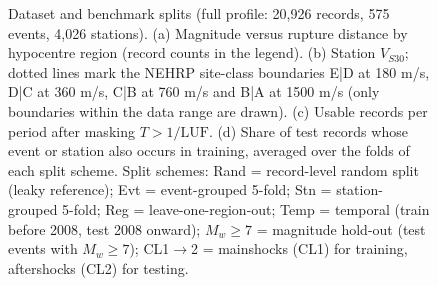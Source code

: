 \begin{figure}[htbp]
\centering
{}
\caption{Dataset and benchmark splits (full profile: 20,926 records, 575 events, 4,026 stations). (a) Magnitude versus rupture distance by hypocentre region (record counts in the legend). (b) Station $V_{S30}$; dotted lines mark the NEHRP site-class boundaries E|D at 180 m/s, D|C at 360 m/s, C|B at 760 m/s and B|A at 1500 m/s (only boundaries within the data range are drawn). (c) Usable records per period after masking $T > 1/\mathrm{LUF}$. (d) Share of test records whose event or station also occurs in training, averaged over the folds of each split scheme. Split schemes: Rand = record-level random split (leaky reference); Evt = event-grouped 5-fold; Stn = station-grouped 5-fold; Reg = leave-one-region-out; Temp = temporal (train before 2008, test 2008 onward); $M_w{\geq}7$ = magnitude hold-out (test events with $M_w \geq 7$); CL1$\rightarrow$2 = mainshocks (CL1) for training, aftershocks (CL2) for testing.}
\label{fig:fig1_data_splits}
\end{figure}
